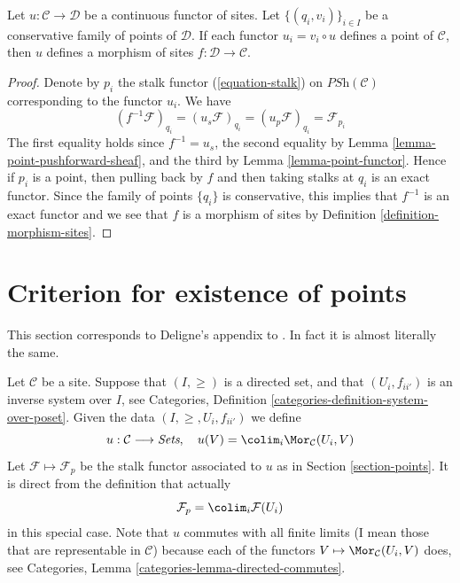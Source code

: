 \begin{lemma}
\label{lemma-check-morphism-sites}
Let $u : \mathcal{C} \to \mathcal{D}$ be a continuous functor of sites.
Let $\{(q_i, v_i)\}_{i\in I}$ be a conservative family of points of
$\mathcal{D}$. If each functor $u_i = v_i \circ u$ defines
a point of $\mathcal{C}$,
then $u$ defines a morphism of sites $f : \mathcal{D} \to \mathcal{C}$.
\end{lemma}

\begin{proof}
Denote by $p_i$ the stalk functor (\ref{equation-stalk}) on
$\textit{PSh}(\mathcal{C})$ corresponding to the functor $u_i$. We have
$$
(f^{-1}\mathcal{F})_{q_i} =
(u_s\mathcal{F})_{q_i} =
(u_p\mathcal{F})_{q_i} =
\mathcal{F}_{p_i}
$$
The first equality holds since $f^{-1} = u_s$, the second equality
by Lemma \ref{lemma-point-pushforward-sheaf}, and the third
by Lemma \ref{lemma-point-functor}.
Hence if $p_i$ is a point, then pulling back by $f$
and then taking stalks at $q_i$ is an exact functor.
Since the family of points $\{q_i\}$ is conservative, this
implies that $f^{-1}$ is an exact functor and we see
that $f$ is a morphism of sites by Definition \ref{definition-morphism-sites}.
\end{proof}





\section{Criterion for existence of points}
\label{section-criterion-points}

\noindent
This section corresponds to Deligne's appendix to \cite[Expos\'e VI]{SGA4}.
In fact it is almost literally the same.

\medskip\noindent
Let $\mathcal{C}$ be a site.
Suppose that $(I, \geq)$ is a directed set,
and that $(U_i, f_{ii'})$ is an inverse system over $I$, see
Categories, Definition \ref{categories-definition-system-over-poset}.
Given the data $(I, \geq, U_i, f_{ii'})$ we define
$$
u : \mathcal{C} \longrightarrow \textit{Sets}, \quad
u(V) = \colim_i \Mor_\mathcal{C}(U_i , V)
$$
Let $\mathcal{F} \mapsto \mathcal{F}_p$ be the stalk functor
associated to $u$ as in Section \ref{section-points}.
It is direct from the definition that actually
$$
\mathcal{F}_p = \colim_i \mathcal{F}(U_i)
$$
in this special case.
Note that $u$ commutes with all finite limits (I mean those that
are representable in $\mathcal{C}$) because
each of the functors $V \mapsto \Mor_\mathcal{C}(U_i , V)$
does, see Categories, Lemma \ref{categories-lemma-directed-commutes}.

